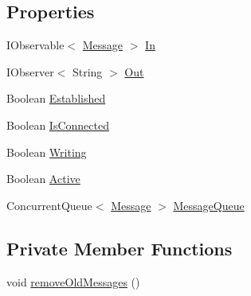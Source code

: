 \subsection*{Properties}
\begin{DoxyCompactItemize}
\item 
I\+Observable$<$ \hyperlink{class_web_analyzer_1_1_models_1_1_message_model_1_1_message}{Message} $>$ \hyperlink{class_web_analyzer_1_1_server_1_1_websocket_connection_aaff532a55d94eaddd75a2619da307c6a}{In}
\item 
I\+Observer$<$ String $>$ \hyperlink{class_web_analyzer_1_1_server_1_1_websocket_connection_a1f0be7b1ff80c5b742204d0883157578}{Out}
\item 
Boolean \hyperlink{class_web_analyzer_1_1_server_1_1_websocket_connection_a913e4dc6584670baea40f5c57a4dedf1}{Established}
\item 
Boolean \hyperlink{class_web_analyzer_1_1_server_1_1_websocket_connection_a54d71b7e50589c027fff5441dea6ca54}{Is\+Connected}
\item 
Boolean \hyperlink{class_web_analyzer_1_1_server_1_1_websocket_connection_a973edb4f0e5e1644f551bf132ae77183}{Writing}
\item 
Boolean \hyperlink{class_web_analyzer_1_1_server_1_1_websocket_connection_af64b83d9aec7d436a262f732e3b03e0b}{Active}
\item 
Concurrent\+Queue$<$ \hyperlink{class_web_analyzer_1_1_models_1_1_message_model_1_1_message}{Message} $>$ \hyperlink{class_web_analyzer_1_1_server_1_1_websocket_connection_a38b19724259bebddd5990d394a3df6fd}{Message\+Queue}
\end{DoxyCompactItemize}
\subsection*{Private Member Functions}
\begin{DoxyCompactItemize}
\item 
void \hyperlink{class_web_analyzer_1_1_server_1_1_websocket_connection_ab856bbd336338d41ea2196df96a39521}{remove\+Old\+Messages} ()
\end{DoxyCompactItemize}
